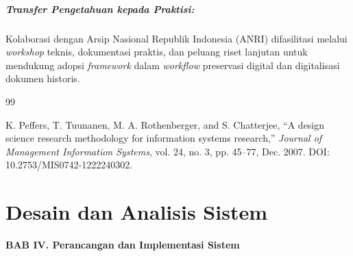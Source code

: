 \documentclass[12pt,a4paper]{book}
\begin{document}
\paragraph{Transfer Pengetahuan kepada Praktisi:}
Kolaborasi dengan Arsip Nasional Republik Indonesia (ANRI) difasilitasi melalui \textit{workshop} teknis, dokumentasi praktis, dan peluang riset lanjutan untuk mendukung adopsi \textit{framework} dalam \textit{workflow} preservasi digital dan digitalisasi dokumen historis.




\begin{thebibliography}{99}

K. Peffers, T. Tuunanen, M. A. Rothenberger, and S. Chatterjee, ``A design science research methodology for information systems research,'' \textit{Journal of Management Information Systems}, vol. 24, no. 3, pp. 45--77, Dec. 2007. DOI: 10.2753/MIS0742-1222240302.

\end{thebibliography}


\chapter{Desain dan Analisis Sistem}


\vspace{2cm}
\begin{center}
{\fontsize{14}{16.8}\selectfont\textbf{BAB IV. Perancangan dan Implementasi Sistem}}\\[1em]
\end{center}
\label{sec:analisis}
\setcounter{section}{4}
\setcounter{subsection}{0}
\vspace{2em}
\label{subsec:analisis-desain}
\vspace{0.8em}
\end{document}
